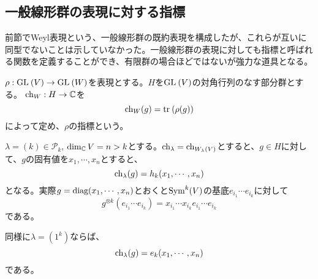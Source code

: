 \documentclass{ltjsreport}
\begin{document}
\subsection{一般線形群の表現に対する指標}

前節でWeyl表現という、一般線形群の既約表現を構成したが、これらが互いに同型でないことは示していなかった。一般線形群の表現に対しても指標と呼ばれる関数を定義することができ、有限群の場合ほどではないが強力な道具となる。

\begin{defin}
  $\rho:\text{GL}\:(V)\rightarrow \text{GL}\:(W)$を表現とする。$H$を$\text{GL}\:(V)$の対角行列のなす部分群とする。
  $\text{ch}_W:H\rightarrow \mathbb{C}$を
  \[
  \text{ch}_W(g)=\text{tr}\:(\rho(g))  
  \]
  によって定め、$\rho$の指標という。
\end{defin}

\begin{eg}
  $\lambda=(k)\in\mathcal{P}_k$, $\dim_{\mathbb{C}} V=n>k$とする。$\text{ch}_\lambda=\text{ch}_{W_\lambda(V)}$とすると、$g\in H$に対して、$g$の固有値を$x_1,\cdots,x_n$とすると、
  \[
  \text{ch}_\lambda(g)=h_k(x_1,\cdots,x_n) 
  \]
  となる。実際$g=\text{diag}(x_1,\cdots,x_n)$とおくと$\text{Sym}^k(V)$の基底$e_{i_1}\cdots e_{i_k}$に対して
  \[
  g^{\otimes k}(e_{i_1}\cdots e_{i_k})=x_{i_1}\cdots x_{i_k}e_{i_1}\cdots e_{i_k}  
  \]
  である。
\end{eg}

\begin{eg}
  同様に$\lambda=(1^k)$ならば、
  \[
  \text{ch}_\lambda(g)=e_k(x_1,\cdots,x_n)  
  \]
  である。
\end{eg}
\end{document}
